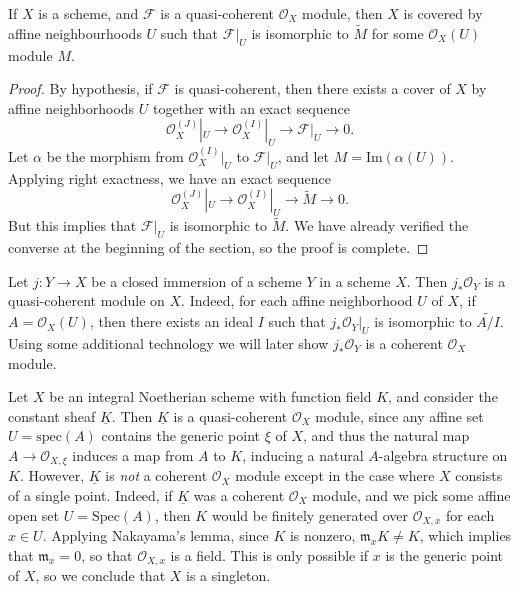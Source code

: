 \begin{lemma}
    If $X$ is a scheme, and $\mathcal{F}$ is a quasi-coherent $\mathcal{O}_X$ module, then $X$ is covered by affine neighbourhoods $U$ such that $\mathcal{F}|_U$ is isomorphic to $\tilde{M}$ for some $\mathcal{O}_X(U)$ module $M$.
\end{lemma}
\begin{proof}
    By hypothesis, if $\mathcal{F}$ is quasi-coherent, then there exists a cover of $X$ by affine neighborhoods $U$ together with an exact sequence
    \[ \mathcal{O}_X^{(J)}|_U \to \mathcal{O}_X^{(I)}|_U \to \mathcal{F}|_U \to 0. \]
    Let $\alpha$ be the morphism from $\mathcal{O}_X^{(I)}|_U$ to $\mathcal{F}|_U$, and let $M = \text{Im}(\alpha(U))$. Applying right exactness, we have an exact sequence
    \[ \mathcal{O}_X^{(J)}|_U \to \mathcal{O}_X^{(I)}|_U \to \widetilde{M} \to 0. \]
    But this implies that $\mathcal{F}|_U$ is isomorphic to $\widetilde{M}$. We have already verified the converse at the beginning of the section, so the proof is complete.
\end{proof}

\begin{example}
    Let $j: Y \to X$ be a closed immersion of a scheme $Y$ in a scheme $X$. Then $j_* \mathcal{O}_Y$ is a quasi-coherent module on $X$. Indeed, for each affine neighborhood $U$ of $X$, if $A = \mathcal{O}_X(U)$, then there exists an ideal $I$ such that $j_* \mathcal{O}_Y|_U$ is isomorphic to $\widetilde{A/I}$. Using some additional technology we will later show $j_* \mathcal{O}_Y$ is a coherent $\mathcal{O}_X$ module.
\end{example}

\begin{example}
    Let $X$ be an integral Noetherian scheme with function field $K$, and consider the constant sheaf $\underline{K}$. Then $\underline{K}$ is a quasi-coherent $\mathcal{O}_X$ module, since any affine set $U = \text{spec}(A)$ contains the generic point $\xi$ of $X$, and thus the natural map $A \to \mathcal{O}_{X,\xi}$ induces a map from $A$ to $K$, inducing a natural $A$-algebra structure on $K$. However, $\underline{K}$ is \emph{not} a coherent $\mathcal{O}_X$ module except in the case where $X$ consists of a single point. Indeed, if $\underline{K}$ was a coherent $\mathcal{O}_X$ module, and we pick some affine open set $U = \text{Spec}(A)$, then $K$ would be finitely generated over $\mathcal{O}_{X,x}$ for each $x \in U$. Applying Nakayama's lemma, since $K$ is nonzero, $\mathfrak{m}_x K \neq K$, which implies that $\mathfrak{m}_x = 0$, so that $\mathcal{O}_{X,x}$ is a field. This is only possible if $x$ is the generic point of $X$, so we conclude that $X$ is a singleton.
\end{example}

